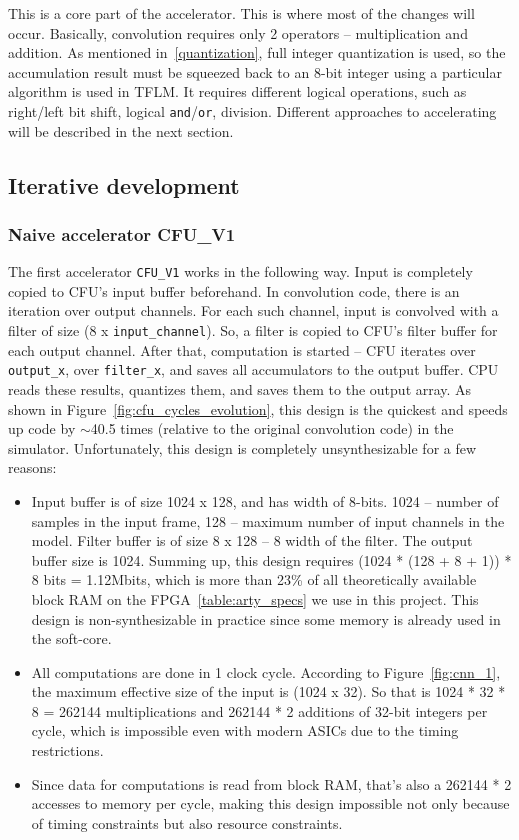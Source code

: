 This is a core part of the accelerator. This is where most of the changes will occur. Basically, convolution requires only 2 operators -- multiplication and addition. As mentioned in~\ref{quantization}, full integer quantization is used, so the accumulation result must be squeezed back to an 8-bit integer using a particular algorithm is used in TFLM. It requires different logical operations, such as right/left bit shift, logical \verb|and|/\verb|or|, division. Different approaches to accelerating will be described in the next section. 

\subsection{Iterative development}

\subsubsection{Naive accelerator CFU\_V1}

The first accelerator \verb|CFU_V1| works in the following way. Input is completely copied to CFU's input buffer beforehand. In convolution code, there is an iteration over output channels. For each such channel, input is convolved with a filter of size (8 x \verb|input_channel|). So, a filter is copied to CFU's filter buffer for each output channel. After that, computation is started -- CFU iterates over \verb|output_x|, over \verb|filter_x|, and saves all accumulators to the output buffer. CPU reads these results, quantizes them, and saves them to the output array. As shown in Figure~\ref{fig:cfu_cycles_evolution}, this design is the quickest and speeds up code by $\sim$40.5 times (relative to the original convolution code) in the simulator. Unfortunately, this design is completely unsynthesizable for a few reasons: 
\begin{itemize}
    \item Input buffer is of size 1024 x 128, and has width of 8-bits. 1024 -- number of samples in the input frame, 128 -- maximum number of input channels in the model. Filter buffer is of size 8 x 128 -- 8 width of the filter. The output buffer size is 1024. Summing up, this design requires (1024 * (128 + 8 + 1)) * 8 bits = 1.12Mbits, which is more than 23\% of all theoretically available block RAM on the FPGA~\ref{table:arty_specs} we use in this project. This design is non-synthesizable in practice since some memory is already used in the soft-core.
    \item All computations are done in 1 clock cycle. According to Figure~\ref{fig:cnn_1}, the maximum effective size of the input is (1024 x 32). So that is 1024 * 32 * 8 = 262144 multiplications and 262144 * 2 additions of 32-bit integers per cycle, which is impossible even with modern ASICs due to the timing restrictions.
    \item Since data for computations is read from block RAM, that's also a 262144 * 2 accesses to memory per cycle, making this design impossible not only because of timing constraints but also resource constraints. 
\end{itemize}

